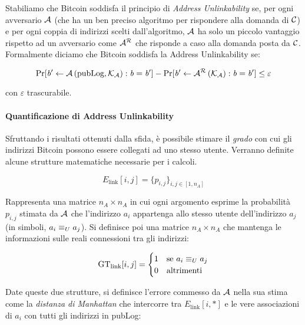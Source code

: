 

Stabiliamo che Bitcoin soddisfa il principio di \emph{Address Unlinkability} se, per ogni avversario $\mathcal{A}$ (che ha un ben preciso algoritmo per rispondere alla domanda di $\mathcal{C}$) e per ogni coppia di indirizzi scelti dall'algoritmo, $\mathcal{A}$ ha solo un piccolo vantaggio rispetto ad un avversario come $\mathcal{A}^\mathcal{R}$ che risponde a caso alla domanda posta da $\mathcal{C}$. Formalmente diciamo che Bitcoin soddisfa la Address Unlinkability se:

\begin{equation*}
\Pr [ \mathit{b}' \leftarrow \mathcal{A} \left(\text{pubLog}, \mathcal{K}_\mathcal{A} \right) : \mathit{b} = \mathit{b}' ] - \Pr [\mathit{b}' \leftarrow \mathcal{A}^\mathcal{R} \left(\mathcal{K}_\mathcal{A} \right) : \mathit{b} = \mathit{b}' ] \leq \varepsilon
\end{equation*}

con $\varepsilon$ trascurabile.

\paragraph{Quantificazione di Address Unlinkability}\label{quantificazione-di-address-unlinkability}

Sfruttando i risultati ottenuti dalla sfida, è possibile stimare il \emph{grado} con cui gli indirizzi Bitcoin possono essere collegati ad uno stesso utente. Verranno definite alcune strutture matematiche necessarie per i calcoli.

\[E_\text{link} [i, j] = \{p_{i,j}\}_{i,j \in [1, n_A ]}\]

Rappresenta una matrice $n_A \times n_A$ in cui ogni argomento esprime la probabilità $p_{i,j}$ stimata da $\mathcal{A}$ che l'indirizzo $a_i$ appartenga allo stesso utente dell'indirizzo $a_j$ (in simboli, $a_i \equiv_U a_j$). Si definisce poi una matrice $n_A \times n_A$ che mantenga le informazioni sulle reali connessioni tra gli indirizzi:

\[\text{GT}_\text{link} [i,j] = \begin{cases} 1 &\text{se } a_i \equiv_U a_j \\ 0 &\text{altrimenti} \end{cases}\]

Date queste due strutture, si definisce l'errore commesso da $\mathcal{A}$ nella sua stima come la \emph{distanza di Manhattan} che intercorre tra $E_\text{link} [i,*]$ e le vere associazioni di $a_i$ con tutti gli indirizzi in pubLog:


